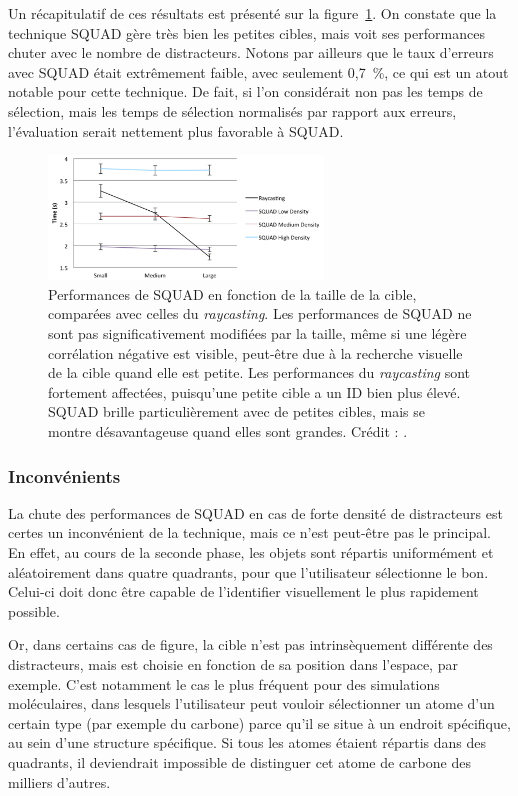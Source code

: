 	Un récapitulatif de ces résultats est présenté sur la figure~\ref{fig:squadRecap}. On constate que la technique SQUAD gère très bien les petites cibles, mais voit ses performances chuter avec le nombre de distracteurs. Notons par ailleurs que le taux d'erreurs avec SQUAD était extrêmement faible, avec seulement 0,7~\%{}, ce qui est un atout notable pour cette technique. De fait, si l'on considérait non pas les temps de sélection, mais les temps de sélection normalisés par rapport aux erreurs, l'évaluation serait nettement plus favorable à SQUAD.
	
	\begin{figure}[!htb]
		\centering
		\includegraphics[width=0.65\textwidth]{figures/ch2/squadRecap}
		\caption[SQUAD -- résultats : taille]{Performances de SQUAD en fonction de la taille de la cible, comparées avec celles du \emph{raycasting}. Les performances de SQUAD ne sont pas significativement modifiées par la taille, même si une légère corrélation négative est visible, peut-être due à la recherche visuelle de la cible quand elle est petite. Les performances du \emph{raycasting} sont fortement affectées, puisqu'une petite cible a un ID bien plus élevé. SQUAD brille particulièrement avec de petites cibles, mais se montre désavantageuse quand elles sont grandes. Crédit : \cite{kopper2011rapid}.}
		\label{fig:squadRecap}
	\end{figure}
	
	\subsubsection{Inconvénients}
	La chute des performances de SQUAD en cas de forte densité de distracteurs est certes un inconvénient de la technique, mais ce n'est peut-être pas le principal. En effet, au cours de la seconde phase, les objets sont répartis uniformément et aléatoirement dans quatre quadrants, pour que l'utilisateur sélectionne le bon. Celui-ci doit donc être capable de l'identifier visuellement le plus rapidement possible.
	
	Or, dans certains cas de figure, la cible n'est pas intrinsèquement différente des distracteurs, mais est choisie en fonction de sa position dans l'espace, par exemple. C'est notamment le cas le plus fréquent pour des simulations moléculaires, dans lesquels l'utilisateur peut vouloir sélectionner un atome d'un certain type (par exemple du carbone) parce qu'il se situe à un endroit spécifique, au sein d'une structure spécifique. Si tous les atomes étaient répartis dans des quadrants, il deviendrait impossible de distinguer cet atome de carbone des milliers d'autres.
	
